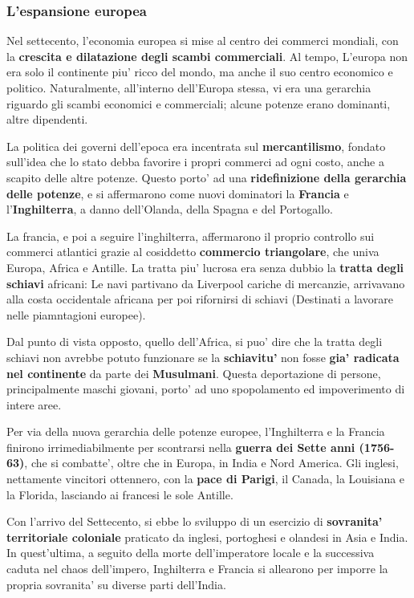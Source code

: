 \documentclass{article}
\begin{document}
{{    \subsubsection{L'espansione europea} %
    Nel settecento, l'economia europea si mise al centro dei commerci mondiali, con la \textbf{crescita e dilatazione degli scambi commerciali}. Al tempo, L'europa non era solo il continente piu' ricco del mondo, ma anche il suo centro economico e politico. Naturalmente, all'interno dell'Europa stessa, vi era una gerarchia riguardo gli scambi economici e commerciali; alcune potenze erano dominanti, altre dipendenti.
    
    La politica dei governi dell'epoca era incentrata sul \textbf{mercantilismo}, fondato sull'idea che lo stato debba favorire i propri commerci ad ogni costo, anche a scapito delle altre potenze. Questo porto' ad una \textbf{ridefinizione della gerarchia delle potenze}, e si affermarono come nuovi dominatori la \textbf{Francia} e l'\textbf{Inghilterra}, a danno dell'Olanda, della Spagna e del Portogallo.

    La francia, e poi a seguire l'inghilterra, affermarono il proprio controllo sui commerci atlantici grazie al cosiddetto \textbf{commercio triangolare}, che univa Europa, Africa e Antille. La tratta piu' lucrosa era senza dubbio la \textbf{tratta degli schiavi} africani: Le navi partivano da Liverpool cariche di mercanzie, arrivavano alla costa occidentale africana per poi rifornirsi di schiavi \small{(Destinati a lavorare nelle piamntagioni europee)}.

    Dal punto di vista opposto, quello dell'Africa, si puo' dire che la tratta degli schiavi non avrebbe potuto funzionare se la \textbf{schiavitu'} non fosse \textbf{gia' radicata nel continente} da parte dei \textbf{Musulmani}. Questa deportazione di persone, principalmente maschi giovani, porto' ad uno spopolamento ed impoverimento di intere aree.

    Per via della nuova gerarchia delle potenze europee, l'Inghilterra e la Francia finirono irrimediabilmente per scontrarsi nella \textbf{guerra dei Sette anni (1756-63)}, che si combatte', oltre che in Europa, in India e Nord America. Gli inglesi, nettamente vincitori ottennero, con la \textbf{pace di Parigi}, il Canada, la Louisiana e la Florida, lasciando ai francesi le sole Antille.

    Con l'arrivo del Settecento, si ebbe lo sviluppo di un esercizio di \textbf{sovranita' territoriale coloniale} praticato da inglesi, portoghesi e olandesi in Asia e India. In quest'ultima, a seguito della morte dell'imperatore locale e la successiva caduta nel chaos dell'impero, Inghilterra e Francia si allearono per imporre la propria sovranita' su diverse parti dell'India.

}}
\end{document}

